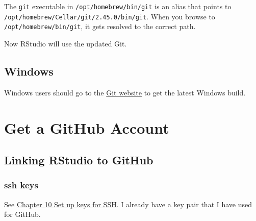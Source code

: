\documentclass[
  letterpaper,
  DIV=11,
  numbers=noendperiod]{scrreprt}
\begin{document}
\begin{tcolorbox}[enhanced jigsaw, left=2mm, title=\textcolor{quarto-callout-note-color}{\faInfo}\hspace{0.5em}{Note}, opacityback=0, breakable, colbacktitle=quarto-callout-note-color!10!white, colframe=quarto-callout-note-color-frame, arc=.35mm, titlerule=0mm, leftrule=.75mm, opacitybacktitle=0.6, toptitle=1mm, colback=white, toprule=.15mm, bottomtitle=1mm, rightrule=.15mm, coltitle=black, bottomrule=.15mm]

The \texttt{git} executable in \texttt{/opt/homebrew/bin/git} is an
alias that points to \texttt{/opt/homebrew/Cellar/git/2.45.0/bin/git}.
When you browse to \texttt{/opt/homebrew/bin/git}, it gets resolved to
the correct path.

\end{tcolorbox}

Now RStudio will use the updated Git.

\subsection{Windows}\label{windows}

Windows users should go to the \href{https://git-scm.com/}{Git website}
to get the latest Windows build.

\section{Get a GitHub Account}\label{get-a-github-account}

\subsection{Linking RStudio to GitHub}\label{linking-rstudio-to-github}

\subsubsection{ssh keys}\label{ssh-keys}

See \href{https://happygitwithr.com/ssh-keys}{Chapter 10 Set up keys for
SSH}. I already have a key pair that I have used for GitHub.
\end{document}
